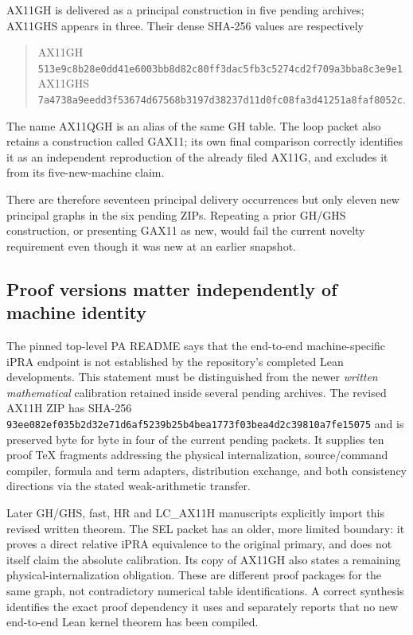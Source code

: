 AX11GH is delivered as a principal construction in five pending archives;
AX11GHS appears in three. Their dense SHA-256 values are respectively
\begin{quote}\small
\textsf{AX11GH}\\
\texttt{513e9c8b28e0dd41e6003bb8d82c80ff3dac5fb3c5274cd2f709a3bba8c3e9e1}\\[3pt]
\textsf{AX11GHS}\\
\texttt{7a4738a9eedd3f53674d67568b3197d38237d11d0fc08fa3d41251a8faf8052c}.
\end{quote}
The name AX11QGH is an alias of the same GH table. The loop packet also
retains a construction called GAX11; its own final comparison correctly
identifies it as an independent reproduction of the already filed AX11G,
and excludes it from its five-new-machine claim.

There are therefore seventeen principal delivery occurrences but only
eleven new principal graphs in the six pending ZIPs. Repeating a prior
GH/GHS construction, or presenting GAX11 as new, would fail the current
novelty requirement even though it was new at an earlier snapshot.

\subsection{Proof versions matter independently of machine identity}

The pinned top-level PA README says that the end-to-end machine-specific
iPRA endpoint is not established by the repository's completed Lean
developments. This statement must be distinguished from the newer
\emph{written mathematical} calibration retained inside several pending
archives. The revised AX11H ZIP has SHA-256
\texttt{93ee082ef035b2d32e71d6af5239b25b4bea1773f03bea4d2c39810a7fe15075}
and is preserved byte for byte in four of the current pending packets.
It supplies ten proof TeX fragments addressing the physical internalization,
source/command compiler, formula and term adapters, distribution exchange,
and both consistency directions via the stated weak-arithmetic transfer.

Later GH/GHS, fast, HR and LC\_AX11H manuscripts explicitly import this
revised written theorem. The SEL packet has an older, more limited boundary:
it proves a direct relative iPRA equivalence to the original primary, and
does not itself claim the absolute calibration. Its copy of AX11GH also
states a remaining physical-internalization obligation. These are different
proof packages for the same graph, not contradictory numerical table
identifications. A correct synthesis identifies the exact proof dependency
it uses and separately reports that no new end-to-end Lean kernel theorem
has been compiled.

